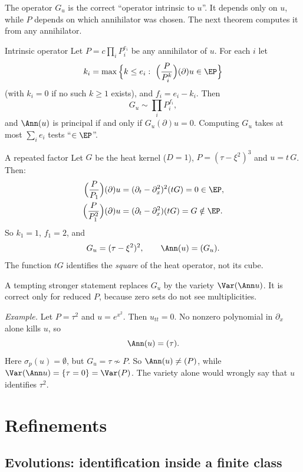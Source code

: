 The operator $G_u$ is the correct ``operator intrinsic to $u$''. It depends only on $u$, while $P$ depends on which annihilator was chosen. The next theorem computes it from any annihilator.

\begin{theorem}{Intrinsic operator  \proved}\label{thm:intrinsic}
Let $P=c\prod_iP_i^{e_i}$ be any annihilator of $u$. For each $i$ let
\[
k_i=\max\Big\{k\le e_i:\ \Big(\frac{P}{P_i^{k}}\Big)(\partial)u\in\EP\Big\}
\]
(with $k_i=0$ if no such $k\ge1$ exists), and $f_i=e_i-k_i$. Then
\[
G_u\sim\prod_iP_i^{f_i},
\]
and $\Ann(u)$ is principal if and only if $G_u(\partial)u=0$. Computing $G_u$ takes at most $\sum_ie_i$ tests ``$\in\EP$''.

\end{theorem}

\begin{example}{A repeated factor}
Let $G$ be the heat kernel ($D=1$), $P=(\tau-\xi^2)^3$ and $u=t\,G$. Then:
\begin{align*}
\Big(\frac{P}{P_1}\Big)(\partial)u&=(\partial_t-\partial_x^2)^2(tG)=0\in\EP,\\
\Big(\frac{P}{P_1^2}\Big)(\partial)u&=(\partial_t-\partial_x^2)(tG)=G\notin\EP .
\end{align*}
So $k_1=1$, $f_1=2$, and
\[
G_u=(\tau-\xi^2)^2,\qquad \Ann(u)=(G_u).
\]
The function $tG$ identifies the \emph{square} of the heat operator, not its cube.
\end{example}

\begin{caution}[title={Why $G_u$ and not the variety}]
A tempting stronger statement replaces $G_u$ by the variety $\Var(\Ann u)$. It is correct only for reduced $P$, because zero sets do not see multiplicities.

\emph{Example.} Let $P=\tau^2$ and $u=e^{x^2}$. Then $u_{tt}=0$. No nonzero polynomial in $\partial_x$ alone kills $u$, so
\[
\Ann(u)=(\tau).
\]
Here $\sigma_p(u)=\emptyset$, but $G_u=\tau\not\sim P$. So $\Ann(u)\ne(P)$, while $\Var(\Ann u)=\{\tau=0\}=\Var(P)$. The variety alone would wrongly say that $u$ identifies $\tau^2$.
\end{caution}

\section{Refinements}

\subsection{Evolutions: identification inside a finite class}

